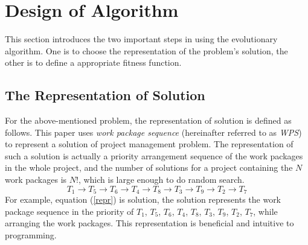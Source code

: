 %
%

\section{Design of Algorithm}
%
This section introduces the two important steps in using the evolutionary
algorithm. One is to choose the representation of the problem's solution, the
other is to define a appropriate fitness function.



  \vspace{-2mm}
\subsection{The Representation of Solution}
  \vspace{-2mm}%
For the above-mentioned problem, the representation of solution is defined as
follows.
This paper uses \emph{work package sequence} (hereinafter referred to as \emph{WPS}) to
represent a solution of project management problem. The representation of such a
solution is actually a priority arrangement sequence of the work packages in
the whole project, and the number of solutions for a project containing the $N$
work packages is $N!$, which is large enough to do random search.
\begin{equation}
  T_1 \rightarrow T_5 \rightarrow T_6 \rightarrow T_4 \rightarrow T_8
  \rightarrow T_3 \rightarrow T_9 \rightarrow T_2 \rightarrow T_7
  \label{repr}
\end{equation}
For example, equation (\ref{repr}) is solution, the solution represents the work
package sequence in the priority of $T_1$, $T_5$, $T_6$, $T_4$, $T_8$, $T_3$,
$T_9$, $T_2$, $T_7$, while arranging the work packages. This representation is
beneficial and intuitive to programming.

